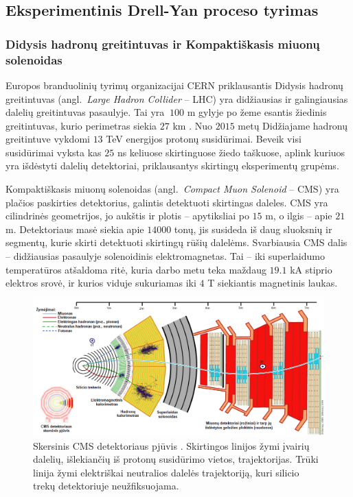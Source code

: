\documentclass[a4paper, 12pt, oneside]{article}
\begin{document}
\subsection{Eksperimentinis Drell-Yan proceso tyrimas}

\subsubsection{Didysis hadronų greitintuvas ir Kompaktiškasis miuonų solenoidas}

Europos branduolinių tyrimų organizacijai CERN priklausantis Didysis hadronų greitintuvas
(angl.\ \textit{Large Hadron Collider} -- LHC) yra didžiausias ir galingiausias dalelių greitintuvas pasaulyje.
Tai yra $~100$ m gylyje po žeme esantis žiedinis greitintuvas, kurio perimetras siekia $27$ km \cite{LHC}.
Nuo $2015$ metų Didžiajame hadronų greitintuve vykdomi $13$ TeV energijos protonų susidūrimai.
Beveik visi susidūrimai vyksta kas $25$ ns keliuose skirtinguose žiedo taškuose, aplink kuriuos yra išdėstyti dalelių
detektoriai, priklausantys skirtingų eksperimentų grupėms.

Kompaktiškasis miuonų solenoidas (angl.\ \textit{Compact Muon Solenoid} -- CMS) \cite{CMSexperiment}
yra plačios paskirties
detektorius, galintis detektuoti skirtingas daleles.
CMS yra cilindrinės geometrijos, jo aukštis ir plotis -- apytiksliai po $15$ m, o ilgis --
apie $21$ m.
Detektoriaus masė siekia apie $14000$ tonų, jis susideda iš daug sluoksnių ir segmentų, kurie skirti
detektuoti skirtingų rūšių dalelėms.
Svarbiausia CMS dalis -- didžiausias pasaulyje solenoidinis elektromagnetas.
Tai -- iki superlaidumo temperatūros atšaldoma ritė, kuria darbo metu teka maždaug $19.1$ kA stiprio
elektros srovė, ir kurios viduje sukuriamas iki $4$ T siekiantis magnetinis laukas.

\vspace{0.2cm}
\begin{figure}[H]
	\includegraphics[width=\textwidth]{CMSslice_LT.png}
	\caption{\label{fig:CMSslice}Skersinis CMS detektoriaus pjūvis \cite{CMSslice}.
	Skirtingos linijos žymi įvairių dalelių, išlekiančių iš protonų susidūrimo vietos, trajektorijas.
	Trūki linija žymi elektriškai neutralios dalelės trajektoriją, kuri silicio trekų detektoriuje
	neužfiksuojama.}
\end{figure}
\end{document}
